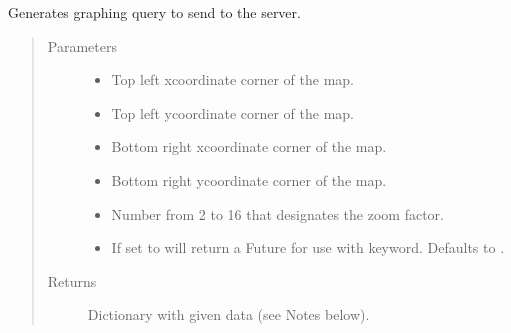 \documentclass[letterpaper,10pt,english,openany,oneside]{sphinxmanual}
\begin{document}

\begin{fulllineitems}
\label{\detokenize{source/api:instahashtag.api.maps}}
Generates graphing query to send to the server.
\begin{quote}\begin{description}
\item[{Parameters}] \leavevmode\begin{itemize}
\item {} 
 \textendash{} Top left x\sphinxhyphen{}coordinate corner of the map.

\item {} 
 \textendash{} Top left y\sphinxhyphen{}coordinate corner of the map.

\item {} 
 \textendash{} Bottom right x\sphinxhyphen{}coordinate corner of the map.

\item {} 
 \textendash{} Bottom right y\sphinxhyphen{}coordinate corner of the map.

\item {} 
 \textendash{} Number from 2 to 16 that designates the zoom factor.

\item {} 
 \textendash{} If set to  will return a Future for use with  keyword. Defaults to .

\end{itemize}

\item[{Returns}] \leavevmode
Dictionary with given data (see Notes below).


\end{description}
\end{quote}
\end{fulllineitems}
\end{document}
